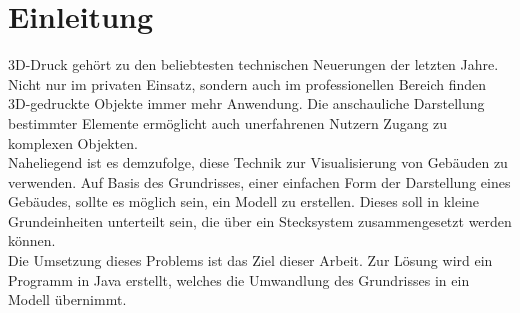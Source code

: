 \chapter{Einleitung}
3D-Druck gehört zu den beliebtesten technischen Neuerungen der letzten Jahre.
Nicht nur im privaten Einsatz, sondern auch im professionellen Bereich finden 3D-gedruckte Objekte immer mehr Anwendung.
Die anschauliche Darstellung bestimmter Elemente ermöglicht auch unerfahrenen Nutzern Zugang zu komplexen Objekten. \\
Naheliegend ist es demzufolge, diese Technik zur Visualisierung von Gebäuden zu verwenden.
Auf Basis des Grundrisses, einer einfachen Form der Darstellung eines Gebäudes, sollte es möglich sein, ein Modell zu erstellen.
Dieses soll in kleine Grundeinheiten unterteilt sein, die über ein Stecksystem zusammengesetzt werden können. \\
Die Umsetzung dieses Problems ist das Ziel dieser Arbeit.
Zur Lösung wird ein Programm in Java erstellt, welches die Umwandlung des Grundrisses in ein Modell übernimmt.

%
%
%
